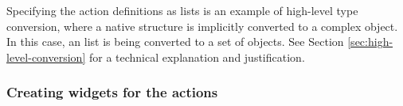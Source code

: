 \documentclass[article,shortnames]{jss}
\begin{document}
Specifying the action definitions as  lists is an example
of  high-level type conversion, where a native  structure
is implicitly converted to a complex  object. In this case,
an  list is being converted to a set of 
objects. See Section \ref{sec:high-level-conversion} for
a technical explanation and justification.

\subsubsection{Creating widgets for the actions}
\end{document}
